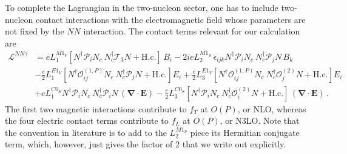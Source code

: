 \documentclass[prl,
twocolumn,
showpacs,preprintnumbers,amsmath,amssymb,
superscriptaddress,
a4paper,nofootinbib,longbibliography]{revtex4-2}
\def\bv#1{\boldsymbol{#1}}
\begin{document}
To complete the Lagrangian in the two-nucleon sector, one has to include two-nucleon contact interactions with the electromagnetic field whose parameters are not fixed by the $NN$ interaction. The contact terms relevant for our calculation are
\begin{align}
\mathcal{L}^{NN\gamma} & = e L_1^{M1_V} \left[N^\dagger \mathcal{P}_i N_c\ N_c^\dagger\mathcal{T}_3 N + \text{H.c.}\right]\, B_i - 2i e L_2^{M1_S}\, \epsilon_{ijk} N^\dagger \mathcal{P}_i N_c\ N_c^\dagger \mathcal{P}_j N\, B_k \nonumber\\
& - \frac{e}{2} L_1^{E1_V}\left[N^\dagger\mathcal{O}_{ij}^{(1,P)} N_c\ N_c^\dagger \mathcal{P}_j N + \text{H.c.}\right] E_i
+\frac{e}{2} L_3^{E1_V}\left[N^\dagger\mathcal{O}_{ij}^{(1,P)} N_c\ N_c^\dagger \mathcal{O}^{(2)}_j N + \text{H.c.}\right] E_i \nonumber\\
& + eL_1^{C0_S} N^\dagger\mathcal{P}_i N_c\ N_c^\dagger \mathcal{P}_i N\, \left(\bv{\nabla}\cdot\bv{E}\right)
- \frac{e}{2}L_3^{C0_S}\left[N^\dagger\mathcal{P}_i N_c\ N_c^\dagger \mathcal{O}^{(2)}_i N + \text{H.c.}\right]\, \left(\bv{\nabla}\cdot\bv{E}\right)\,.
\end{align}
The first two magnetic interactions contribute to $f_T$ at $O(P)$, or NLO, whereas the four electric contact terms contribute to $f_L$ at $O(P)$, or N3LO. Note that the convention in literature is to add to the $L_2^{M1_S}$ piece its Hermitian conjugate term, which, however, just gives the factor of $2$ that we write out explicitly.
\end{document}

